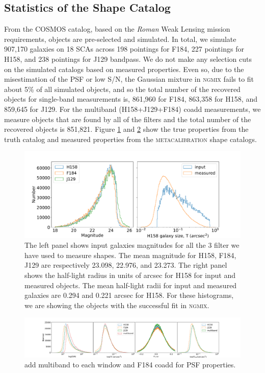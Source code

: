 \documentclass[fleqn,usenatbib]{mnras}
\begin{document}
\subsection{Statistics of the Shape Catalog}
From the COSMOS catalog, based on the \emph{Roman} Weak Lensing mission requirements, objects are pre-selected and simulated. In total, we simulate 907,170 galaxies on 18 SCAs across 198 pointings for F184, 227 pointings for H158, and 238 pointings for J129 bandpass. We do not make any selection cuts on the simulated catalogs based on measured properties. Even so, due to the misestimation of the PSF or low S/N, the Gaussian mixture in \textsc{ngmix} fails to fit about 5\% of all simulated objects, and so the total number of the recovered objects for single-band measurements is, 861,960 for F184, 863,358 for H158, and 859,645 for J129. For the multiband (H158+J129+F184) coadd measurements, we measure objects that are found by all of the filters and the total number of the recovered objects is 851,821.
Figure \ref{fig:true_properties} and \ref{fig:measured_properties} show the true properties from the truth catalog and measured properties from the \textsc{metacalibration} shape catalogs. 

\begin{figure}
    \hspace*{-1.5cm}
	\includegraphics[scale=0.3]{true_properties.pdf}
	\centering
    \caption{The left panel shows input galaxies magnitudes for all the 3 filter we have used to measure shapes. The mean magnitude for H158, F184, J129 are respectively 23.098, 22.976, and 23.273. The right panel shows the half-light radius in units of arcsec for H158 for input and measured objects. The mean half-light radii for input and measured galaxies are 0.294 and 0.221 arcsec for H158. For these histograms, we are showing the objects with the successful fit in \textsc{ngmix}.}
    \label{fig:true_properties}
\end{figure}

\begin{figure}
    \hspace*{-3.0cm}
    \centering
	\includegraphics[scale=0.34]{ngmix_snr_T.pdf}
    \caption{add multiband to each window and F184 coadd for PSF properties.}
    \label{fig:measured_properties}
\end{figure}
\end{document}
